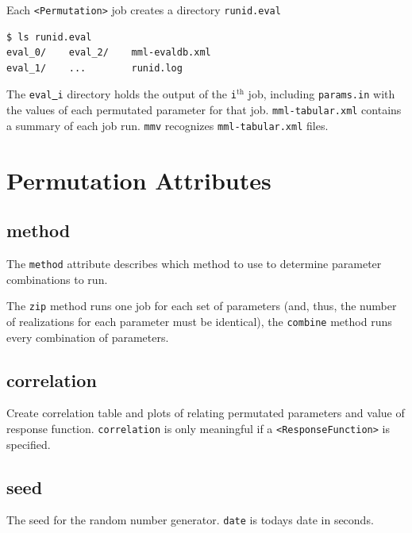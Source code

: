 \documentclass[12pt,report,strict]{SANDreport/SANDreport}
\newcommand{\mmv}{\texttt{mmv}}
\newcommand{\us}{\underline{  }}
\renewcommand{\tag}[1]{\texttt{<#1>}}
\begin{document}
Each \tag{Permutation} job creates a directory \texttt{runid.eval}
\begin{verbatim}
$ ls runid.eval
eval_0/    eval_2/    mml-evaldb.xml
eval_1/    ...        runid.log
\end{verbatim}

The \texttt{eval\us{}i} directory holds the output of the
\texttt{i}$^{\text{th}}$ job, including \texttt{params.in} with the values of
each permutated parameter for that job. \texttt{mml-tabular.xml} contains a
summary of each job run. \mmv{} recognizes \texttt{mml-tabular.xml} files.

\section{Permutation Attributes}
\label{sec:perm-attr}

\subsection{method}
\label{sec:perm-meth}
The \texttt{method} attribute describes which method to use to determine
parameter combinations to run.

The \texttt{zip} method runs one job for each set of parameters (and, thus,
the number of realizations for each parameter must be identical), the
\texttt{combine} method runs every combination of parameters.

\subsection{correlation}
\label{sec:perm-corr}
Create correlation table and plots of relating permutated parameters and value
of response function. \texttt{correlation} is only meaningful if a
\tag{ResponseFunction} is specified.

\subsection{seed}
\label{sec:perm-seed}
The seed for the random number generator. \texttt{date} is todays date in
seconds.

\end{document}
